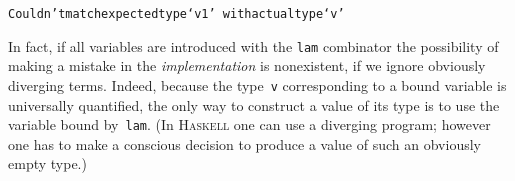 \documentclass[9pt,preprint,authoryear]{sigplanconf}
\begin{document}
{{{}\vphantom{$\{$}}}\textcolor[rgb]{0.63,0.13,0.94}{\texttt{\makebox[1.22ex][c]{-}\makebox[1.22ex][c]{-}\mbox{\hspace{0.50em}}Couldn{'}t\mbox{\hspace{0.50em}}match\mbox{\hspace{0.50em}}expected\mbox{\hspace{0.50em}}type\mbox{\hspace{0.50em}}{`}v1{'}}}\textcolor[rgb]{0,0,0.80}{\texttt{{\nopagebreak \newline%
}\vphantom{$\{$}}}\textcolor[rgb]{0.63,0.13,0.94}{\texttt{\makebox[1.22ex][c]{-}\makebox[1.22ex][c]{-}\mbox{\hspace{6.50em}}with\mbox{\hspace{0.50em}}actual\mbox{\hspace{0.50em}}type\mbox{\hspace{0.50em}}{`}v{'}}}\textcolor[rgb]{0,0,0.80}{\texttt{{\nopagebreak \newline%
}\vphantom{$\{$}}}%


%
%


%
In fact, if all variables are introduced with the \textcolor[rgb]{0,0,0.80}{\texttt{lam}} combinator
    the possibility of making a mistake in the
    \emph{implementation} is nonexistent, if we ignore obviously diverging terms.
    Indeed, because the type{~}\textcolor[rgb]{0,0,0.80}{\texttt{v}} corresponding to a bound variable is
    universally quantified, the only way to construct a value of its
    type is to use the variable bound by{~}\textcolor[rgb]{0,0,0.80}{\texttt{lam}}. (In \textsc{Haskell}    one can use a diverging program; however one has to make a conscious decision 
    to produce a value of such an obviously empty type.)%
\end{document}
